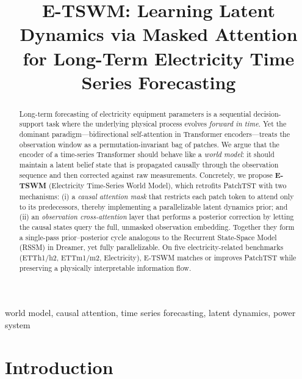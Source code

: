\documentclass[conference]{IEEEtran}
\begin{document}
\title{E-TSWM: Learning Latent Dynamics via Masked Attention for Long-Term Electricity Time Series Forecasting}

\author{
}

\maketitle

\begin{abstract}
Long-term forecasting of electricity equipment parameters is a sequential decision-support task where the underlying physical process evolves \emph{forward in time}. Yet the dominant paradigm---bidirectional self-attention in Transformer encoders---treats the observation window as a permutation-invariant bag of patches. We argue that the encoder of a time-series Transformer should behave like a \emph{world model}: it should maintain a latent belief state that is propagated causally through the observation sequence and then corrected against raw measurements. Concretely, we propose \textbf{E-TSWM} (Electricity Time-Series World Model), which retrofits PatchTST with two mechanisms: (i) a \emph{causal attention mask} that restricts each patch token to attend only to its predecessors, thereby implementing a parallelizable latent dynamics prior; and (ii) an \emph{observation cross-attention} layer that performs a posterior correction by letting the causal states query the full, unmasked observation embedding. Together they form a single-pass prior--posterior cycle analogous to the Recurrent State-Space Model (RSSM) in Dreamer, yet fully parallelizable. On five electricity-related benchmarks (ETTh1/h2, ETTm1/m2, Electricity), E-TSWM matches or improves PatchTST while preserving a physically interpretable information flow.
\end{abstract}

\begin{IEEEkeywords}
world model, causal attention, time series forecasting, latent dynamics, power system
\end{IEEEkeywords}

\section{Introduction}
\end{document}
